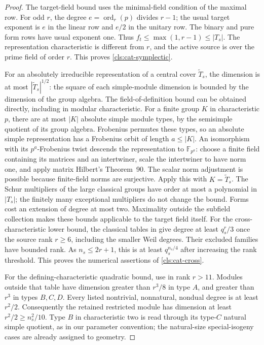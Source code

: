 \begin{proof}
The target-field bound uses the minimal-field condition of the
maximal row.  For odd $r$, the degree
$e=\operatorname{ord}_r(p)$ divides $r-1$; the usual target exponent
is $e$ in the linear row and $e/2$ in the unitary row.
The binary and pure form rows have usual exponent one.
Thus $f_t\leq\max(1,r-1)\leq |T_s|$.
The representation characteristic is different from $r$, and the
active source is over the prime field of order $r$.
This proves \ref{cls:cat-symplectic}.

For an absolutely irreducible representation of a central cover
$\widetilde T_s$, the dimension is at most
$|\widetilde T_s|^{1/2}$: the square of each simple-module dimension
is bounded by the dimension of the group algebra.  The field-of-definition bound can be obtained directly, including in
modular characteristic.  For a finite group $K$ in characteristic $p$,
there are at most $|K|$ absolute simple module types, by the semisimple
quotient of its group algebra.  Frobenius permutes these types, so an
absolute simple representation has a Frobenius orbit of length
$a\leq |K|$.  An isomorphism with its $p^a$-Frobenius twist descends the
representation to $\mathbb F_{p^a}$: choose a finite field containing
its matrices and an intertwiner, scale the intertwiner to have norm
one, and apply matrix Hilbert's Theorem~90.  The scalar norm adjustment
is possible because finite-field norms are surjective.  Apply this
with $K=\widetilde T_s$.  The Schur multipliers of the
large classical groups have order at most a polynomial in $|T_s|$;
the finitely many exceptional multipliers do not change the bound.
Forms cost an extension of degree at most two.  Maximality outside
the subfield collection makes these bounds applicable to the target
field itself.  For the cross-characteristic lower bound, the
classical tables in \cite[Section~3, Tables~3--6]{Hasa2014} give
degree at least $q_s^r/3$ once the source rank $r\geq6$, including
the smaller Weil degrees.  Their excluded families have bounded
rank.  As $n_s\leq2r+1$, this is at least $q_s^{n_s/4}$ after
increasing the rank threshold.  This proves the numerical assertions
of \ref{cls:cat-cross}.

For the defining-characteristic quadratic bound, use
\cite[Theorem~5.1 and Table~2]{Luebeck2001} in rank $r>11$.
Modules outside that table have dimension greater than $r^3/8$
in type $A$, and greater than $r^3$ in types $B,C,D$.
Every listed nontrivial, nonnatural, nondual degree is at least $r^2/2$.
Consequently the retained restricted module has dimension at
least $r^2/2\geq n_s^2/10$.  Type $B$ in characteristic two is
read through its type-$C$ natural simple quotient, as in our
parameter convention; the natural-size special-isogeny cases are
already assigned to geometry.


\end{proof}
